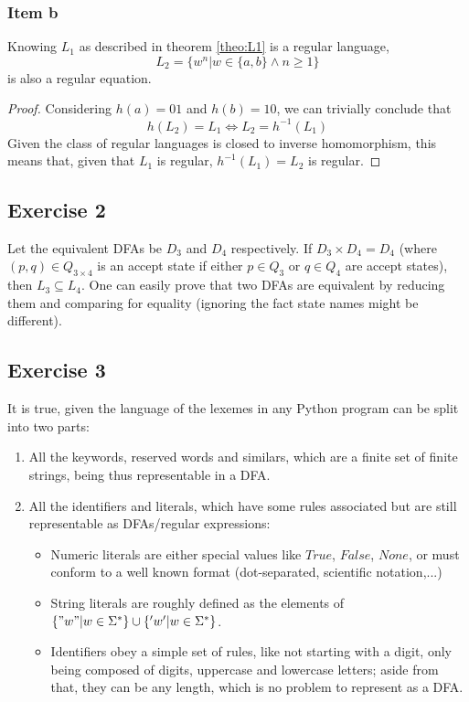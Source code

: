 {\subsubsection{Item b}
\begin{theorem}
	Knowing $L_1$ as described in theorem \ref{theo:L1} is a regular language,
	\begin{equation*}
		L_2 = \{w^n | w \in \{a,b\} \wedge n \geq 1 \}
	\end{equation*}
	is also a regular equation.
\end{theorem}
\begin{proof}
Considering $h(a)=01$ and $h(b)=10$, we can trivially conclude that
\begin{equation*}
	h(L_2)=L_1 \iff L_2 = h^{-1}(L_1)
\end{equation*}
Given the class of regular languages is closed to inverse homomorphism, this means that, given that $L_1$ is regular, $h^{-1}(L_1)=L_2$ is regular.
\end{proof}
}
\subsection{Exercise 2}
Let the equivalent DFAs be $D_3$ and $D_4$ respectively. If $D_3 \times D_4=D_4$ (where $(p,q)\in Q_{3 \times 4}$ is an accept state if either $p \in Q_3$ or $q \in Q_4$ are accept states), then $L_3 \subseteq L_4$. One can easily prove that two DFAs are equivalent by reducing them and comparing for equality (ignoring the fact state names might be different).
\subsection{Exercise 3}
It is true, given the language of the lexemes in any Python program can be split into two parts:
\begin{enumerate}
	\item All the keywords, reserved words and similars, which are a finite set of finite strings, being thus representable in a DFA.
	\item All the identifiers and literals, which have some rules associated but are still representable as DFAs/regular expressions:
	\begin{itemize}
		\item Numeric literals are either special values like $True$, $False$, $None$, or must conform to a well known format (dot-separated, scientific notation,...)
		\item String literals are roughly defined as the elements of $\{"w" | w \in \Sigma^* \} \cup \{'w' | w \in \Sigma^* \}$.
		\item Identifiers obey a simple set of rules, like not starting with a digit, only being composed of digits, uppercase and lowercase letters; aside from that, they can be any length, which is no problem to represent as a DFA.
	\end{itemize}
\end{enumerate}